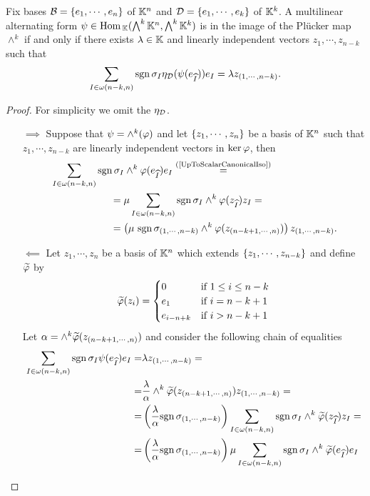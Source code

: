 \begin{lemma}\label{DecomposabilityOfMultilinearForm}
Fix bases $\mathcal{B}=\left\{{e_1,\cdots, e_n}\right\}$ of $\mathbb{K}^n$ and $\mathcal{D}=\left\{{e_1,\cdots, e_k}\right\}$ of $\mathbb{K}^k$. A multilinear alternating form $\psi\in \mathrm{Hom}\,_{\mathbb{K}}(\bigwedge^k\mathbb{K}^n,\bigwedge^k\mathbb{K}^k)$ is in the image of the Pl\"ucker map $\wedge^k$ if and only if there exists $\lambda\in\mathbb{K}$ and linearly independent vectors $z_1,\cdots,z_{n-k}$ such that
\[\sum_{I\in \omega(n-k,n)}\mathrm{sgn}\,\sigma_I\eta_{\mathcal{D}}(\psi(e_{\widehat{I}}))e_I=\lambda z_{(1,\cdots, n-k)}.\]
\end{lemma}
\begin{proof}
For simplicity we omit the $\eta_{\mathcal{D}}$. 
\setlength{\leftmargini}{0cm}
\begin{itemize}
\item[$\boxed{\implies}$] Suppose that $\psi=\wedge^k(\varphi)$ and let $\left\{{z_1,\cdots, z_n}\right\}$ be a basis of $\mathbb{K}^n$ such that $z_1,\cdots, z_{n-k}$ are linearly independent vectors in $\ker \varphi$, then
\begin{align*}
&\sum_{I\in \omega(n-k,n)}\sgn\sigma_I\wedge^k\vp(e_{\wh I})e_I\pasgnl={(\ref{UpToScalarCanonicalIso})}\\
&\qquad\qquad\qquad=\mu\sum_{I\in \omega(n-k,n)}\sgn\sigma_I\wedge^k\vp(z_{\wh I})z_I=\\
&\qquad\qquad\qquad=\pa{\mu\ \sgn\sigma_{(1,\cdots,n-k)}\wedge^k\vp(z_{(n-k+1,\cdots,n)}) }z_{\pa{1,\cdots, n-k}}.
\end{align*}
\item[$\boxed{\impliedby}$] Let $z_1,\cdots, z_n$ be a basis of $\mathbb{K}^n$ which extends $\left\{{z_1,\cdots, z_{n-k}}\right\}$ and define $\widetilde{\varphi}$ by
\[\widetilde{\varphi}(z_i)=\begin{cases}
0 & \text{if }1\leq i\leq n-k\\
e_1 & \text{if }i=n-k+1\\
e_{i-n+k} & \text{if }i>n-k+1
\end{cases}\]
Let $\alpha=\wedge^k\widetilde{\varphi}(z_{(n-k+1,\cdots, n)})$ and consider the following chain of equalities
\begin{align*}
\sum_{I\in \omega(n-k,n)}\sgn\sigma_I\psi(e_{\wh I})e_I=&\la z_{(1,\cdots, n-k)}=\\
=&\frac\la\al\wedge^k\wt\vp(z_{(n-k+1,\cdots, n)}) z_{(1,\cdots, n-k)}=\\
=&\pa{\frac\la\al\sgn\sigma_{(1,\cdots,n-k)}}\sum_{I\in \omega(n-k,n)}\sgn\sigma_I\wedge^k\wt\vp(z_{\wh I})z_I=\\
=&\pa{\frac\la\al\sgn\sigma_{(1,\cdots,n-k)}}\mu\sum_{I\in \omega(n-k,n)}\sgn\sigma_I\wedge^k\wt\vp(e_{\wh I})e_I

\end{align*}
\end{itemize}
\end{proof}
